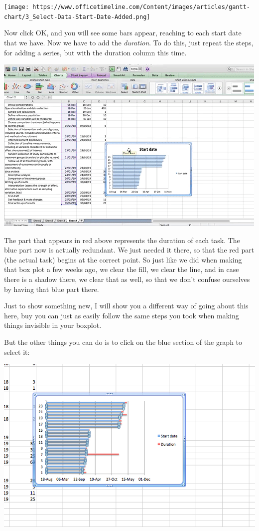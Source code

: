 \documentclass[]{book}
\theoremstyle{definition}
\theoremstyle{definition}
\theoremstyle{definition}
\theoremstyle{remark}
\begin{document}
\texttt{[image: https://www.officetimeline.com/Content/images/articles/gantt-chart/3\_Select-Data-Start-Date-Added.png]}

Now click OK, and you will see some bars appear, reaching to each start
date that we have. Now we have to add the \emph{duration}. To do this,
just repeat the steps, for adding a series, but with the duration column
this time.

\includegraphics{imgs/gantt_select_data_2.gif}

The part that appears in red above represents the duration of each task.
The blue part now is actually redundant. We just needed it there, so
that the red part (the actual task) begins at the correct point. So just
like we did when making that box plot a few weeks ago, we clear the
fill, we clear the line, and in case there is a shadow there, we clear
that as well, so that we don't confuse ourselves by having that blue
part there.

Just to show something new, I will show you a different way of going
about this here, buy you can just as easily follow the same steps you
took when making things invisible in your boxplot.

But the other things you can do is to click on the blue section of the
graph to select it:

\includegraphics{imgs/gantt_select_blue.png}
\end{document}
